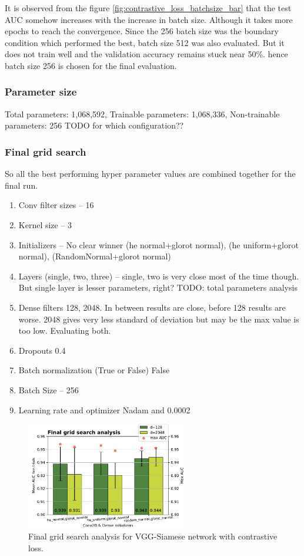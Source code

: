 It is observed from the figure \ref{fig:contrastive_loss_batchsize_bar} that the test AUC somehow increases with the increase in batch size. Although it takes more epochs to reach the convergence. 
Since the 256 batch size was the boundary condition which performed the best, batch size 512 was also evaluated. But it does not train well and the validation accuracy remains stuck near 50\%.
hence batch size 256 is chosen for the final evaluation. 

\subsubsection{Parameter size}
Total parameters: 1,068,592, Trainable parameters: 1,068,336, Non-trainable parameters: 256 TODO for which configuration??

\subsubsection{Final grid search}
So all the best performing hyper parameter values are combined together for the final run. 

\begin{enumerate}
   \item Conv filter sizes -- 16
   \item Kernel size -- 3
   \item Initializers -- No clear winner (he normal+glorot normal), (he uniform+glorot normal), (RandomNormal+glorot normal)
   \item Layers (single, two, three) -- single, two is very close most of the time though. But single layer is lesser parameters, right? TODO: total parameters analysis
   \item Dense filters 128, 2048. In between results are close, before 128 results are worse. 2048 gives very less standard of deviation but may be the max value is too low. Evaluating both.
   \item Dropouts 0.4
   \item Batch normalization (True or False) False
   \item Batch Size -- 256
   \item Learning rate and optimizer Nadam and 0.0002
  \end{enumerate}
\begin{figure}[ht]
\centering
\includegraphics[width= 7cm]{images/contrastive/contrastive_loss_final_bar}
\caption{Final grid search analysis for VGG-Siamese network with contrastive loss.}
\label{fig:contrastive_loss_final_bar}
\end{figure}

